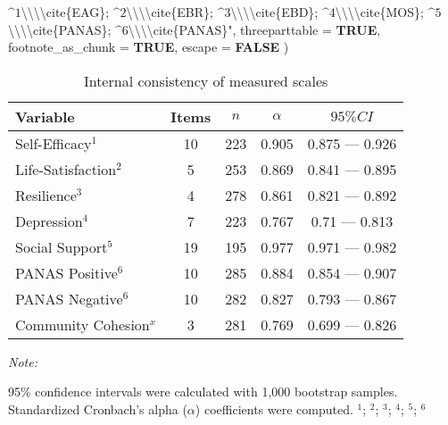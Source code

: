 \documentclass[
  bookmarksnumbered]{article}
\newenvironment{Shaded}{\begin{snugshade}}{\end{snugshade}}
\newcommand{\AttributeTok}[1]{\textcolor[rgb]{0.80,0.80,0.80}{#1}}
\newcommand{\ConstantTok}[1]{\textcolor[rgb]{0.86,0.64,0.64}{\textbf{#1}}}
\newcommand{\NormalTok}[1]{\textcolor[rgb]{0.80,0.80,0.80}{#1}}
\newcommand{\SpecialCharTok}[1]{\textcolor[rgb]{0.86,0.64,0.64}{#1}}
\newcommand{\StringTok}[1]{\textcolor[rgb]{0.80,0.58,0.58}{#1}}
\begin{document}
\begin{Shaded}
\begin{Highlighting}[]
\StringTok{           $\^{}1$}\SpecialCharTok{\textbackslash{}\textbackslash{}\textbackslash{}\textbackslash{}}\StringTok{cite\{EAG\};}
\StringTok{           $\^{}2$}\SpecialCharTok{\textbackslash{}\textbackslash{}\textbackslash{}\textbackslash{}}\StringTok{cite\{EBR\};}
\StringTok{           $\^{}3$}\SpecialCharTok{\textbackslash{}\textbackslash{}\textbackslash{}\textbackslash{}}\StringTok{cite\{EBD\};}
\StringTok{           $\^{}4$}\SpecialCharTok{\textbackslash{}\textbackslash{}\textbackslash{}\textbackslash{}}\StringTok{cite\{MOS\};}
\StringTok{           $\^{}5$}\SpecialCharTok{\textbackslash{}\textbackslash{}\textbackslash{}\textbackslash{}}\StringTok{cite\{PANAS\};}
\StringTok{           $\^{}6$}\SpecialCharTok{\textbackslash{}\textbackslash{}\textbackslash{}\textbackslash{}}\StringTok{cite\{PANAS\}"}\NormalTok{,}
    \AttributeTok{threeparttable =} \ConstantTok{TRUE}\NormalTok{, }\AttributeTok{footnote\_as\_chunk =} \ConstantTok{TRUE}\NormalTok{, }\AttributeTok{escape =} \ConstantTok{FALSE}
\NormalTok{  )}
\end{Highlighting}
\end{Shaded}

\begin{table}[H]
\centering
\caption{\label{tab:tab-cronbach-alpha}Internal consistency of measured scales}
\centering
\begin{threeparttable}
\begin{tabular}[t]{lcccc}
\toprule
Variable & Items & $n$ & $\alpha$ & $95\% CI$\\
\midrule
Self-Efficacy$^1$ & 10 & 223 & 0.905 & 0.875 — 0.926\\
Life-Satisfaction$^2$ & 5 & 253 & 0.869 & 0.841 — 0.895\\
Resilience$^3$ & 4 & 278 & 0.861 & 0.821 — 0.892\\
Depression$^4$ & 7 & 223 & 0.767 & 0.71 — 0.813\\
Social Support$^5$ & 19 & 195 & 0.977 & 0.971 — 0.982\\
PANAS Positive$^6$ & 10 & 285 & 0.884 & 0.854 — 0.907\\
PANAS Negative$^6$ & 10 & 282 & 0.827 & 0.793 — 0.867\\
Community Cohesion$^x$ & 3 & 281 & 0.769 & 0.699 — 0.826\\
\bottomrule
\end{tabular}
\begin{tablenotes}[para]
\item \textit{Note: } 
\item 95\% confidence intervals were calculated with 1,000 bootstrap samples.
           Standardized Cronbach's alpha ($\alpha$) coefficients were computed.
           $^1$\cite{EAG};
           $^2$\cite{EBR};
           $^3$\cite{EBD};
           $^4$\cite{MOS};
           $^5$\cite{PANAS};
           $^6$\cite{PANAS}
\end{tablenotes}
\end{threeparttable}
\end{table}
\end{document}
